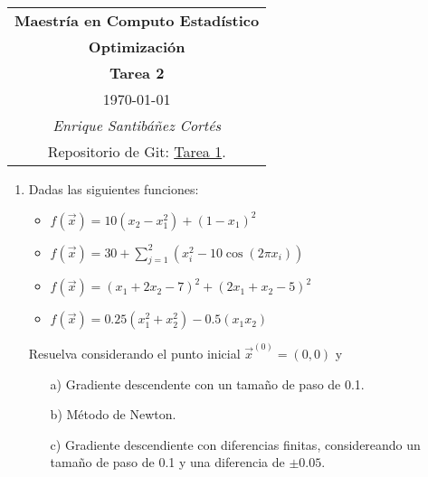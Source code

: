 \documentclass[11pt,letterpaper]{article}
\begin{document}
\begin{table}[ht]
\centering
\begin{tabular}{c}
\textbf{Maestría en Computo Estadístico}\\
\textbf{Optimización}\\
\textbf{Tarea 2}\\
\today \\
\emph{Enrique Santibáñez Cortés}\\
Repositorio de Git: \href{https://https://github.com/Enriquesec/Optimizacion/tree/master/tareas/tarea_2}{Tarea 1}.
\end{tabular}
\end{table}

\begin{enumerate}
\item Dadas las siguientes funciones:
\begin{itemize}
\item $f(\overrightarrow{x})=10(x_2-x_1^2)+(1-x_1)^2$
\item $f(\overrightarrow{x})=30+\sum_{j=1}^2 (x_i^2-10\cos (2\pi x_i))$
\item $f(\overrightarrow{x})=(x_1+2x_2-7)^2+(2x_1+x_2-5)^2$
\item $f(\overrightarrow{x})=0.25(x_1^2+x_2^2)-0.5(x_1 x_2)$
\end{itemize}
Resuelva considerando el punto inicial $\overrightarrow{x}^{(0)}=(0,0)$ y 
\begin{itemize}
\item[a)] Gradiente descendente con un tamaño de paso de 0.1.
\item[b)] Método de Newton.
\item[c)] Gradiente descendiente con diferencias finitas, considereando un tamaño de paso de 0.1 y una diferencia de $\pm 0.05$.
\end{itemize}


\end{enumerate}
\end{document}
